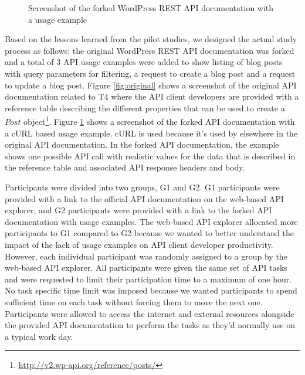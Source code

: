 \documentclass[conference]{IEEEtran}
\begin{document}
\begin{figure}[tb]
\begin{center}
\end{center}
\caption{Screenshot of the forked WordPress REST API documentation with a usage example}
\label{fig:forked}
\end{figure}


Based on the lessons learned from the pilot studies, we designed the actual study process as follows: the original WordPress REST API documentation was forked and a total of 3 API usage examples were added to show listing of blog posts with query parameters for filtering, a request to create a blog post and a request to update a blog post. Figure \ref{fig:original} shows a screenshot of the original API documentation related to T4 where the API client developers are provided with a reference table describing the different properties that can be used to create a $Post$ object\footnote{\url{http://v2.wp-api.org/reference/posts/}}. Figure \ref{fig:forked} shows a screenshot of the forked API documentation with a cURL based usage example. cURL is used because it's used by elsewhere in the original API documentation. In the forked API documentation, the example shows one possible API call with realistic values for the data that is described in the reference table and associated API response headers and body.

Participants were divided into two groups, G1 and G2. G1 participants were provided with a link to the official API documentation on the web-based API explorer, and G2 participants were provided with a link to the forked API documentation with usage examples. The web-based API explorer allocated more participants to G1 compared to G2 because we wanted to better understand the impact of the lack of usage examples on API client developer productivity. However, each individual participant was randomly assigned to a group by the web-based API explorer. All participants were given the same set of API tasks and were requested to limit their participation time to a maximum of one hour. No task specific time limit was imposed because we wanted participants to spend sufficient time on each task without forcing them to move the next one. Participants were allowed to access the internet and external resources alongside the provided API documentation to perform the tasks as they'd normally use on a typical work day.
\end{document}
